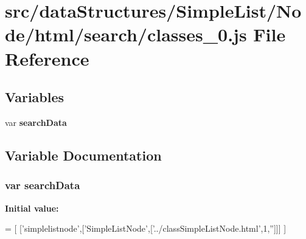 \section{src/data\-Structures/\-Simple\-List/\-Node/html/search/classes\-\_\-0.js File Reference}
\label{_simple_list_2_node_2html_2search_2classes__0_8js}
\subsection*{Variables}
\begin{DoxyCompactItemize}
\item 
var {\bf search\-Data}
\end{DoxyCompactItemize}


\subsection{Variable Documentation}
\subsubsection[{search\-Data}]{\setlength{\rightskip}{0pt plus 5cm}var search\-Data}\label{_simple_list_2_node_2html_2search_2classes__0_8js_ad01a7523f103d6242ef9b0451861231e}
{\bfseries Initial value\-:}
\begin{DoxyCode}
=
[
  [\textcolor{stringliteral}{'simplelistnode'},[\textcolor{stringliteral}{'SimpleListNode'},[\textcolor{stringliteral}{'../classSimpleListNode.html'},1,\textcolor{stringliteral}{''}]]]
]
\end{DoxyCode}
